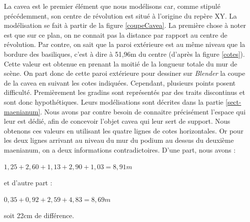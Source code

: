 La \gls{cavea} est le premier élément que nous modélisons car, comme stipulé précédemment, son centre de révolution est situé à l'origine du repère XY. La modélisation se fait à partir de la figure \ref{coupeCavea}. La première chose à noter est que sur ce plan, on ne connait pas la distance par rapport au centre de révolution. Par contre, on sait que la paroi extérieure est au même niveau que la bordure des \glspl{basilique}, c'est à dire à 51,96m du centre (d'après la figure \ref{cotes}). Cette valeur est obtenue en prenant la moitié de la longueur totale du mur de scène. On part donc de cette paroi extérieure pour dessiner sur \textit{Blender} la coupe de la \gls{cavea} en suivant les cotes indiquées. Cependant, plusieurs points posent difficulté. Premièrement les gradins sont représentés par des traits discontinus et sont donc hypothétiques. Leurs modélisations sont décrites dans la partie \ref{sect-maenianum}. Nous avons par contre besoin de connaitre précisément l'espace qui leur est dédié, afin de concevoir l'objet  \gls{cavea} qui leur sert de support. Nous obtenons ces valeurs en utilisant les quatre lignes de cotes horizontales. Or pour les deux lignes arrivant au niveau du mur du  \gls{podium} au dessus du deuxième \gls{maenianum}, on a deux informations contradictoires. D'une part, nous avons :
\begin{center}
$1,25+2,60+1,13+2,90+1,03=8,91m$
\end{center}
et d'autre part :
\begin{center}
$0,35+0,92+2,59+4,83=8,69m$
\end{center}
soit 22cm de différence. \\

